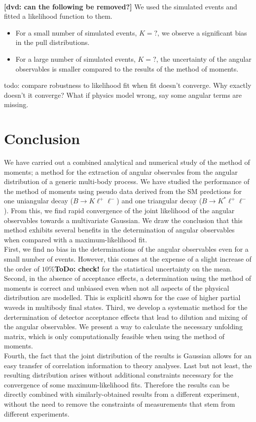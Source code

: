 \documentclass[aps,prd,reprint,nofootinbib,preprintnumbers]{revtex4}
\newcommand{\todo}[1]{{\color{red}\bf ToDo: #1}}
\newcommand{\danny}[1]{{\color{purple}#1}}
\begin{document}
\hrulefill\\
{\textbf{\color{red}[dvd: can the following be removed?]}
We used the simulated events and fitted a likelihood function to them.
\begin{itemize}
    \item For a small number of simulated events, \danny{$K=?$}, we observe a significant bias in the pull distributions.
    \item For a large number of simulated events, \danny{$K=?$}, the uncertainty of the angular observables is
        smaller compared to the results of the method of moments.
\end{itemize}
todo: compare robustness to likelihood fit when fit doesn't
converge. Why exactly doesn't it converge? What if physics model
wrong, say some angular terms are missing.}
\hrulefill


\section{Conclusion}

We have carried out a combined analytical and numerical study of the method of moments; a method for
the extraction of angular observales from the angular distribution of a generic multi-body process.
We have studied the performance of the method of moments using pseudo data derived from the SM
predctions for one uniangular decay ($B\to K\ell^+\ell^-$) and one triangular decay ($B\to K^*\ell^+\ell^-$).
From this, we find rapid convergence of the joint likelihood of the angular observables towards a multivariate Gaussian.
We draw the conclusion that this method exhibits several benefits in the determination of angular observables when
compared with a maximum-likelihood fit.\\

First, we find no bias in the determinations of the angular observables even for a small number of events.
However, this comes at the expense of a slight increase of the order of $10\%$\todo{check!} for the statistical uncertainty
on the mean.
Second, in the absence of acceptance effects, a determination using the method of moments is correct and unbiased
even when not all aspects of the physical distribution are modelled. This is explicitl shown for the case of
higher partial waveds in multibody final states.
Third, we develop a systematic method for the dertermination of detector acceptance effects that lead to
dilution and mixing of the angular observables. We present a way to calculate the necessary unfolding matrix,
which is only computationally feasible when using the method of moments.\\
Fourth, the fact that the joint distribution of the results is Gaussian allows for an easy transfer of correlation
information to theory analyses.
Last but not least, the resulting distribution arises without additional constraints necessary for the convergence
of some maximum-likelihood fits. Therefore the results can be directly combined with similarly-obtained results from
a different experiment, without the need to remove the constraints of measurements that stem from different experiments.\\
\end{document}
